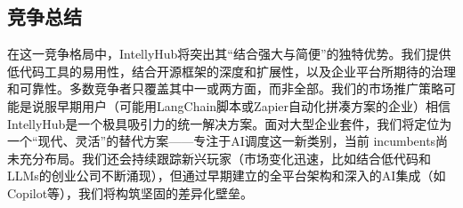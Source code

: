 \documentclass[11点, A4纸, 单面]{article}
\begin{document}
\subsection{竞争总结}
在这一竞争格局中，IntellyHub将突出其“结合强大与简便”的独特优势。我们提供低代码工具的易用性，结合开源框架的深度和扩展性，以及企业平台所期待的治理和可靠性。多数竞争者只覆盖其中一或两方面，而非全部。我们的市场推广策略可能是说服早期用户（可能用LangChain脚本或Zapier自动化拼凑方案的企业）相信IntellyHub是一个极具吸引力的统一解决方案。面对大型企业套件，我们将定位为一个“现代、灵活”的替代方案——专注于AI调度这一新类别，当前 incumbents尚未充分布局。我们还会持续跟踪新兴玩家（市场变化迅速，比如结合低代码和LLMs的创业公司不断涌现），但通过早期建立的全平台架构和深入的AI集成（如Copilot等），我们将构筑坚固的差异化壁垒。


\end{document}
